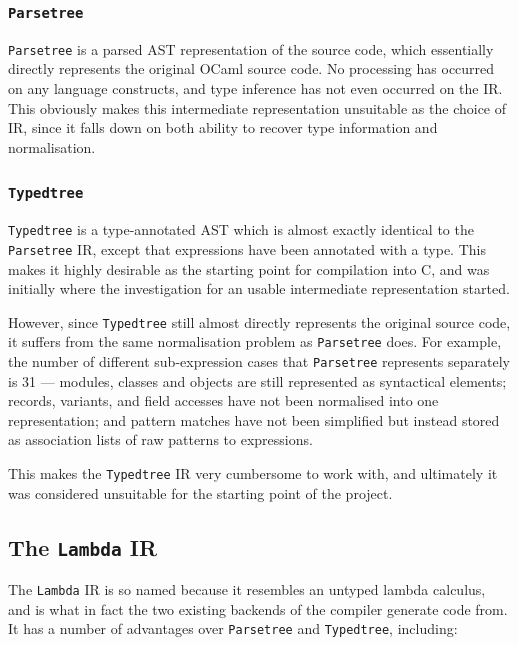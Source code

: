 \subsubsection{\texttt{Parsetree}}

\texttt{Parsetree} is a parsed AST representation of the source code, which 
essentially directly represents the original OCaml source code. No processing 
has occurred on any language constructs, and type inference has not even 
occurred on the IR. This obviously makes this intermediate representation 
unsuitable as the choice of IR, since it falls down on both ability to recover 
type information and normalisation.

\subsubsection{\texttt{Typedtree}}

\texttt{Typedtree} is a type-annotated AST which is almost exactly identical to
the \texttt{Parsetree} IR, except that expressions have been annotated with a
type. This makes it highly desirable as the starting point for compilation into
C, and was initially where the investigation for an usable intermediate
representation started.

However, since \texttt{Typedtree} still almost directly represents the original
source code, it suffers from the same normalisation problem as
\texttt{Parsetree} does. For example, the number of different sub-expression
cases that \texttt{Parsetree} represents separately is 31 --- modules, classes
and objects are still represented as syntactical elements; records, variants,
and field accesses have not been normalised into one representation; and pattern
matches have not been simplified but instead stored as association lists of raw
patterns to expressions.

This makes the \texttt{Typedtree} IR very cumbersome to work with, and 
ultimately it was considered unsuitable for the starting point of the project.

\subsection{The \texttt{Lambda} IR}

The \texttt{Lambda} IR is so named because it resembles an untyped lambda 
calculus, and is what in fact the two existing backends of the compiler 
generate code from. It has a number of advantages over \texttt{Parsetree} and 
\texttt{Typedtree}, including:

